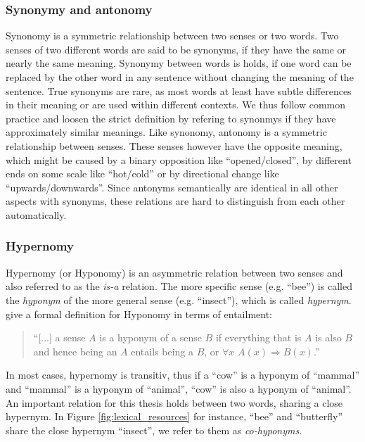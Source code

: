\subsubsection{Synonymy and antonomy}
Synonomy is a symmetric relationship between two senses or two words. Two senses of two different words are said to be synonyms, if they have the same or nearly the same meaning. Synonymy between words is holds, if one word can be replaced by the other word in any sentence  without changing the meaning of the sentence. True synonyms are rare, as most words at least have subtle differences in their meaning or are used within different contexts. We thus follow common practice and loosen the strict definition by refering to synonmys if they have approximately similar meanings. Like synonomy, antonomy is a symmetric relationship between senses. These senses however have the opposite meaning, which might be caused by a binary opposition like ``opened/closed'', by different ends on some scale like ``hot/cold'' or by directional change like ``upwards/downwards''. Since antonyms semantically are identical in all other aspects with synonyms, these relations are hard to distinguish from each other automatically.

\subsubsection{Hypernomy}
Hypernomy (or Hyponomy) is an asymmetric relation between two senses and also referred to as the \textit{is-a} relation. The more specific sense (e.g. ``bee'') is called the \textit{hyponym} of the more general sense (e.g. ``insect''), which is called \textit{hypernym}. \cite{Jurafsky2008May} give a formal definition for Hyponomy in terms of entailment: 
\begin{quotation}\noindent
``[...] a sense $A$ is a hyponym of a sense $B$ if everything that is $A$ is also $B$ and hence being an $A$ entails being a $B$, or $\forall x$ $A(x) \Rightarrow B(x)$.'' \citep{Jurafsky2008May}
\end{quotation}
In most cases, hypernomy is transitiv, thus if a ``cow'' is a hyponym of ``mammal'' and ``mammal'' is a hyponym of ``animal'', ``cow'' is also a hyponym of ``animal''. An important relation for this thesis holds between two words, sharing a close hypernym. In Figure \ref{fig:lexical_resources} for instance, ``bee'' and ``butterfly'' share the close hypernym ``insect'', we refer to them as \textit{co-hyponyms}.

